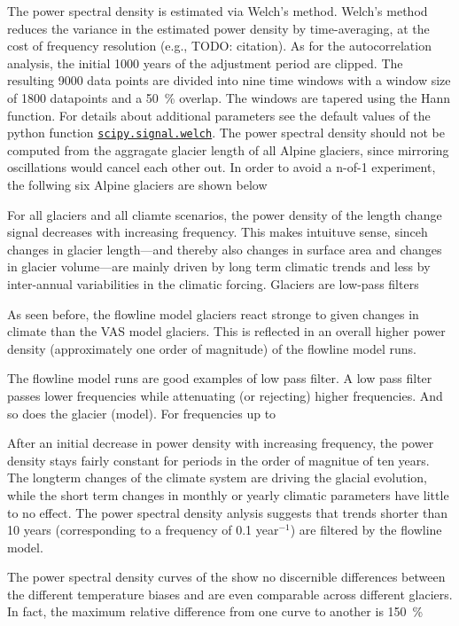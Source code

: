       The power spectral density is estimated via Welch's method. Welch's method reduces the variance in the estimated power density by time-averaging, at the cost of frequency resolution (e.g., TODO: citation). As for the autocorrelation analysis, the initial 1000 years of the adjustment period are clipped. The resulting 9000 data points are divided into nine time windows with a window size of 1800 datapoints and a \SI{50}{\percent} overlap. The windows are tapered using the Hann function. For details about additional parameters see the default values of the python function \href{https://docs.scipy.org/doc/scipy/reference/generated/scipy.signal.welch.html}{\lstinline`scipy.signal.welch`}. The power spectral density should not be computed from the aggragate glacier length of all Alpine glaciers, since mirroring oscillations would cancel each other out. In order to avoid a n-of-1 experiment, the follwing six Alpine glaciers are shown below %

      For all glaciers and all cliamte scenarios, the power density of the length change signal decreases with increasing frequency. This makes intuituve sense, sinceh changes in glacier length---and thereby also changes in surface area and changes in glacier volume---are mainly driven by long term climatic trends and less by inter-annual variabilities in the climatic forcing. Glaciers are low-pass filters

      As seen before, the flowline model glaciers react stronge to given changes in climate than the VAS model glaciers. This is reflected in an overall higher power density (approximately one order of magnitude) of the flowline model runs.

      The flowline model runs are good examples of low pass filter. A low pass filter passes lower frequencies while attenuating (or rejecting) higher frequencies. And so does the glacier (model). For frequencies up to 

      After an initial decrease in power density with increasing frequency, the power density stays fairly constant for periods in the order of magnitue of ten years. The longterm changes of the climate system are driving the glacial evolution, while the short term changes in monthly or yearly climatic parameters have little to no effect. The power spectral density anlysis suggests that trends  shorter than 10 years (corresponding to a frequency of 0.1 year$^{-1}$) are filtered by the flowline model.

      The power spectral density curves of the \vas{} show no discernible differences between the different temperature biases and are even comparable across different glaciers. In fact, the maximum relative difference from one curve to another is \SI{150}{\percent}

